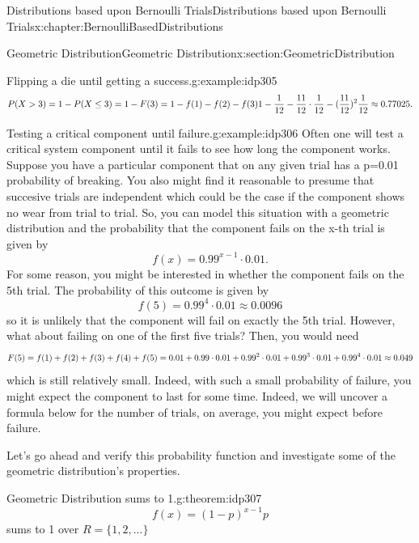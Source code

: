 \documentclass[oneside,10pt,]{book}
\numberwithin{equation}{section}
\begin{document}
\begin{chapterptx}{Distributions based upon Bernoulli Trials}{}{Distributions based upon Bernoulli Trials}{}{}{x:chapter:BernoulliBasedDistributions}
\begin{sectionptx}{Geometric Distribution}{}{Geometric Distribution}{}{}{x:section:GeometricDistribution}
\begin{example}{Flipping a die until getting a success.}{g:example:idp305}
\begin{equation*}
P(X > 3) = 1 - P(X \le 3) = 1 - F(3) = 1 - f(1) - f(2) - f(3) \\
1 - \frac{1}{12} - \frac{11}{12} \cdot \frac{1}{12} - (\frac{11}{12})^2 \frac{1}{12} \approx 0.77025.
\end{equation*}
%
\end{example}
\begin{example}{Testing a critical component until failure.}{g:example:idp306}%
Often one will test a critical system component until it fails to see how long the component works. Suppose you have a particular component that on any given trial has a p=0.01 probability of breaking. You also might find it reasonable to presume that succesive trials are independent which could be the case if the component shows no wear from trial to trial. So, you can model this situation with a geometric distribution and the probability that the component fails on the x-th trial is given by%
\begin{equation*}
f(x) = 0.99^{x-1} \cdot 0.01.
\end{equation*}
For some reason, you might be interested in whether the component fails on the 5th trial. The probability of this outcome is given by%
\begin{equation*}
f(5) = 0.99^4 \cdot 0.01 \approx 0.0096
\end{equation*}
so it is unlikely that the component will fail on exactly the 5th trial. However, what about failing on one of the first five trials? Then, you would need%
\begin{equation*}
F(5) = f(1)+f(2)+f(3)+f(4)+f(5) \\ = 0.01 + 0.99 \cdot 0.01 + 0.99^2 \cdot 0.01 + 0.99^3 \cdot 0.01 + 0.99^4 \cdot 0.01 \approx 0.049
\end{equation*}
which is still relatively small. Indeed, with such a small probability of failure, you might expect the component to last for some time. Indeed, we will uncover a formula below for the number of trials, on average, you might expect before failure.%
\end{example}
Let's go ahead and verify this probability function and investigate some of the geometric distribution's properties.%
\par
\begin{theorem}{Geometric Distribution sums to 1.}{}{g:theorem:idp307}%
%
\begin{equation*}
f(x) = (1-p)^{x-1}p
\end{equation*}
sums to 1 over \(R = \{ 1, 2, ... \}\)%
\end{theorem}

\end{sectionptx}
\end{chapterptx}
\end{document}
